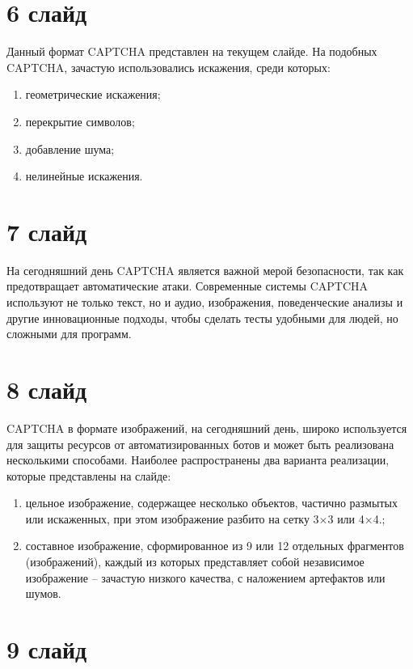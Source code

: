 \documentclass{altsu-report}
\begin{document}
\section*{6 слайд}

Данный формат CAPTCHA представлен на текущем слайде. На подобных CAPTCHA, 
зачастую использовались искажения, среди которых:

\begin{enumerate}
    \item геометрические искажения;
    \item перекрытие символов;
    \item добавление шума;
    \item нелинейные искажения.
\end{enumerate}

\section*{7 слайд}

На сегодняшний день CAPTCHA является важной мерой безопасности, так как 
предотвращает автоматические атаки. Современные системы CAPTCHA используют не 
только текст, но и аудио, изображения, поведенческие анализы и другие 
инновационные подходы, чтобы сделать тесты удобными для людей, но сложными для 
программ.

\section*{8 слайд}

CAPTCHA в формате изображений, на сегодняшний день, широко используется для 
защиты ресурсов от автоматизированных ботов и может быть реализована несколькими 
способами. Наиболее распространены два варианта реализации, которые представлены 
на слайде:

\begin{enumerate}
    \item цельное изображение, содержащее несколько объектов, частично размытых 
    или искаженных, при этом изображение разбито на сетку 3×3 или 4×4.;
    \item составное изображение, сформированное из 9 или 12 отдельных фрагментов 
    (изображений), каждый из которых представляет собой независимое изображение 
    -- зачастую низкого качества, с наложением артефактов или шумов.
\end{enumerate}

\section*{9 слайд}
\end{document}
